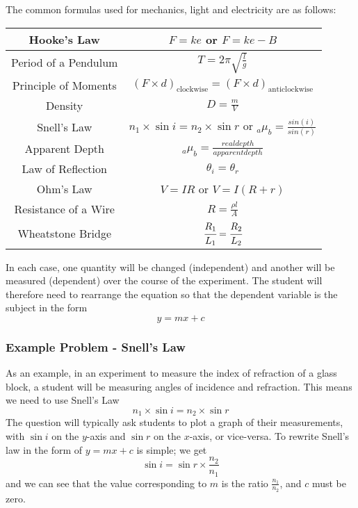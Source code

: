 The common formulas used for mechanics, light and electricity are as follows:

\begin{center}
\begin{tabular}{ | c | c | }
\hline
Hooke's Law & $ F = ke $ or $ F = ke - B $ \\ \hline
Period of a Pendulum & $T = 2\pi\sqrt{\frac{l}{g}}$ \\ \hline
Principle of Moments & $(F \times d)_{\mathrm{clockwise}} = (F \times d)_{\mathrm{anticlockwise}}$ \\ \hline
Density & $D = \frac{m}{V} $\\ \hline
Snell's Law & $n_1 \times \sin{i} = n_2 \times \sin{r}$ or $_a \mu_b = \frac{sin(i)}{sin(r)}$ \\ \hline
Apparent Depth & $_a \mu_b = \frac{real depth}{apparent depth}$ \\ \hline
Law of Reflection & $\theta _i = \theta _r $ \\ \hline
Ohm's Law & $V=IR$ or $V = I(R + r)$\\ \hline
Resistance of a Wire & $R = \frac{\rho l}{A}$ \\ \hline
Wheatstone Bridge & $\cfrac{R_1}{L_1} = \cfrac{R_2}{L_2}$ \\ \hline
\end{tabular}
\end{center}

In each case, one quantity will be changed (independent) and another will be
measured (dependent) over the course of the experiment. The student will therefore need
to rearrange the equation so that the dependent variable is the subject in the form
$$y = mx + c$$

\subsubsection{Example Problem - Snell's Law}
As an example, in an experiment to measure the index of refraction of a glass block, a
student will be measuring angles of incidence and refraction. This means we need to use
Snell’s Law $$n_1 \times \sin{i} = n_2 \times \sin{r}$$
The question will typically ask students to plot a graph of their measurements, with $\sin{i}$
on the $y$-axis and $\sin{r}$ on the $x$-axis, or vice-versa. To rewrite Snell’s law in the form of
$y = mx + c$ is simple; we get $$\sin{i} = \sin{r} \times \frac{n_2}{n_1}$$
and we can see that the value corresponding to $m$ is the ratio $\frac{n_1}{n_2}$, and $c$ must be zero.

